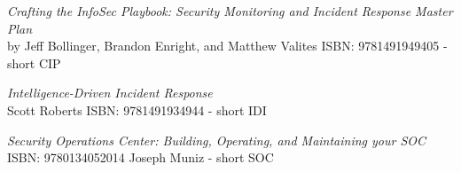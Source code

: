 \documentclass[Screen16to9,17pt]{foils}
\begin{document}


\emph{Crafting the InfoSec Playbook: Security Monitoring and Incident Response Master Plan}\\
 by Jeff Bollinger, Brandon Enright, and Matthew Valites ISBN: 9781491949405 - short CIP




\emph{Intelligence-Driven Incident Response} \\
 Scott Roberts ISBN: 9781491934944 - short IDI




\emph{Security Operations Center: Building, Operating, and Maintaining your SOC}\\
ISBN: 9780134052014 Joseph Muniz - short SOC
\end{document}
